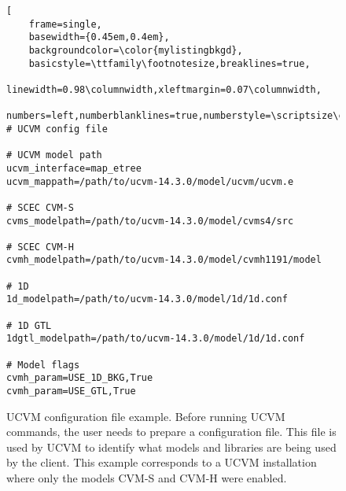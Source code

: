 
\begin{figure}[ht!]
\begin{lstlisting}[
	frame=single,
	basewidth={0.45em,0.4em},
	backgroundcolor=\color{mylistingbkgd},
	basicstyle=\ttfamily\footnotesize,breaklines=true,
	linewidth=0.98\columnwidth,xleftmargin=0.07\columnwidth,
	numbers=left,numberblanklines=true,numberstyle=\scriptsize\color{mylistingnclr}]
# UCVM config file

# UCVM model path
ucvm_interface=map_etree
ucvm_mappath=/path/to/ucvm-14.3.0/model/ucvm/ucvm.e

# SCEC CVM-S
cvms_modelpath=/path/to/ucvm-14.3.0/model/cvms4/src

# SCEC CVM-H
cvmh_modelpath=/path/to/ucvm-14.3.0/model/cvmh1191/model

# 1D
1d_modelpath=/path/to/ucvm-14.3.0/model/1d/1d.conf

# 1D GTL
1dgtl_modelpath=/path/to/ucvm-14.3.0/model/1d/1d.conf

# Model flags
cvmh_param=USE_1D_BKG,True
cvmh_param=USE_GTL,True
\end{lstlisting}
\caption{UCVM configuration file example. Before running UCVM commands, the user needs to prepare a configuration file. This file is used by UCVM to identify what models and libraries are being used by the client. This example corresponds to a UCVM installation where only the models CVM-S and CVM-H were enabled.}
\label{fig:ucvm-config}
\end{figure}
